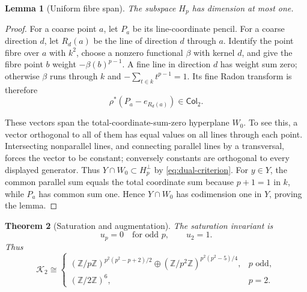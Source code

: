\documentclass[12pt,a4paper]{article}
\newtheorem{theorem}{Theorem}[section]
\newtheorem{lemma}[theorem]{Lemma}
\theoremstyle{definition}
\newcommand{\Z}{\mathbb Z}
\begin{document}
\begin{lemma}[Uniform fibre span]\label{lem:fibre-span}
The subspace $H_p$ has dimension at most one.
\end{lemma}

\begin{proof}
For a coarse point $a$, let $P_a$ be its line-coordinate pencil.  For a
coarse direction $d$, let $R_d(a)$ be the line of direction $d$ through
$a$.  Identify the point fibre over $a$ with $k^2$, choose a nonzero
functional $\beta$ with kernel $d$, and give the fibre point $b$ weight
$-\beta(b)^{p-1}$.  A fine line in direction $d$ has weight sum zero;
otherwise $\beta$ runs through $k$ and
$-\sum_{t\in k}t^{p-1}=1$.  Its fine Radon transform is therefore
\[
 \rho^*(P_a-e_{R_d(a)})\in\mathsf{Col}_2.
\]

These vectors span the total-coordinate-sum-zero hyperplane $W_0$.  To see
this, a vector orthogonal to all of them has equal values on all lines
through each point.  Intersecting nonparallel lines, and connecting parallel
lines by a transversal, forces the vector to be constant; conversely
constants are orthogonal to every displayed generator.  Thus
$Y\cap W_0\subset H_p^\perp$ by \eqref{eq:dual-criterion}.  For $y\in Y$,
the common parallel sum equals the total coordinate sum because
$p+1=1$ in $k$, while $P_a$ has common sum one.  Hence $Y\cap W_0$ has
codimension one in $Y$, proving the lemma.
\end{proof}

\begin{theorem}[Saturation and augmentation]
\label{thm:saturation-augmentation}
The saturation invariant is
\[
 u_p=0\quad\text{for odd }p,\qquad u_2=1.
\]
Thus
\[
 \mathcal K_2\cong
 \begin{cases}
 (\Z/p\Z)^{p^2(p^2-p+2)/2}\oplus
 (\Z/p^2\Z)^{p^2(p^2-5)/4},&p\text{ odd},\\
 (\Z/2\Z)^6,&p=2.
 \end{cases}
\]
\end{theorem}
\end{document}
